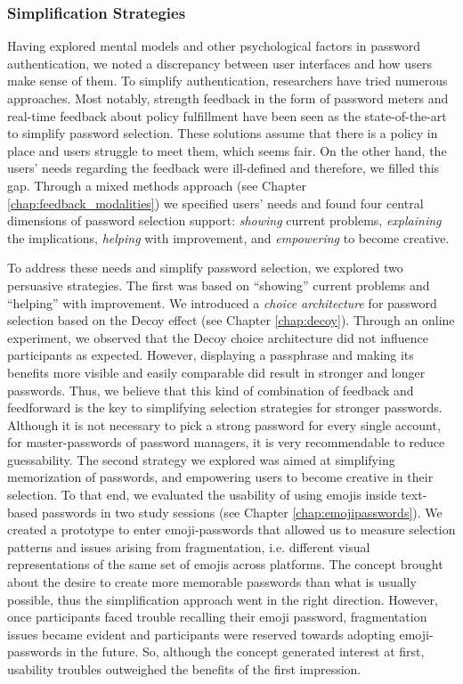 \subsubsection{Simplification Strategies}
Having explored mental models and other psychological factors in password authentication, we noted a discrepancy between user interfaces and how users make sense of them. To simplify authentication, researchers have tried numerous approaches. Most notably, strength feedback in the form of password meters and real-time feedback about policy fulfillment have been seen as the state-of-the-art to simplify password selection. These solutions assume that there is a policy in place and users struggle to meet them, which seems fair. 
On the other hand, the users' needs regarding the feedback were ill-defined and therefore, we filled this gap. Through a mixed methods approach (see Chapter \ref{chap:feedback_modalities}) we specified users' needs and found four central dimensions of password selection support: \textit{showing} current problems, \textit{explaining} the implications, \textit{helping} with improvement, and \textit{empowering} to become creative.

To address these needs and simplify password selection, we explored two persuasive strategies. The first was based on ``showing'' current problems and ``helping'' with improvement. We introduced a \textit{choice architecture} for password selection based on the Decoy effect (see Chapter \ref{chap:decoy}). Through an online experiment, we observed that the Decoy choice architecture did not influence participants as expected. However, displaying a passphrase and making its benefits more visible and easily comparable did result in stronger and longer passwords. Thus, we believe that this kind of combination of feedback and feedforward is the key to simplifying selection strategies for stronger passwords. Although it is not necessary to pick a strong password for every single account, for master-passwords of password managers, it is very recommendable to reduce guessability. The second strategy we explored was aimed at simplifying memorization of passwords, and empowering users to become creative in their selection. To that end, we evaluated the usability of using emojis inside text-based passwords in two study sessions (see Chapter \ref{chap:emojipasswords}). We created a prototype to enter emoji-passwords that allowed us to measure selection patterns and issues arising from fragmentation, i.e. different visual representations of the same set of emojis across platforms. The concept brought about the desire to create more memorable passwords than what is usually possible, thus the simplification approach went in the right direction. However, once participants faced trouble recalling their emoji password, fragmentation issues became evident and participants were reserved towards adopting emoji-passwords in the future. So, although the concept generated interest at first, usability troubles outweighed the benefits of the first impression. 

